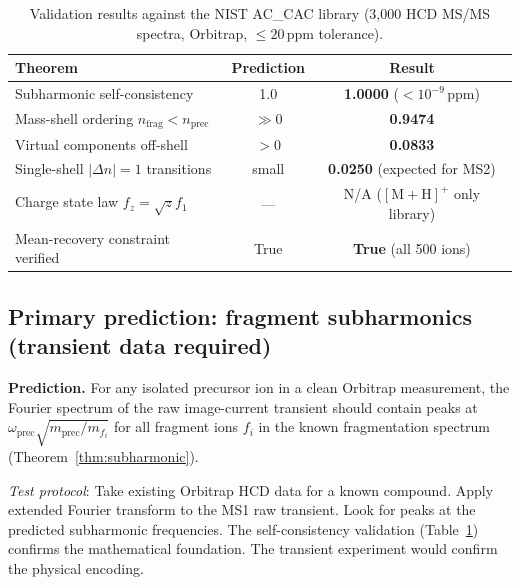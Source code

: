 \documentclass[twocolumn,10pt,a4paper]{article}
\theoremstyle{thmstyle}
\theoremstyle{definition}
\theoremstyle{remark}
\begin{document}
\begin{table}[h]
\centering
\caption{Validation results against the NIST AC\_CAC library
         (3{,}000 HCD MS/MS spectra, Orbitrap, $\leq 20$\,ppm tolerance).}
\label{tab:validation_phasecoherence}
\small
\begin{tabular}{lcc}
\toprule
\textbf{Theorem} & \textbf{Prediction} & \textbf{Result} \\
\midrule
Subharmonic self-consistency
  & 1.0
  & \textbf{1.0000} ($<10^{-9}$\,ppm) \\
Mass-shell ordering $n_{\text{frag}} < n_{\text{prec}}$
  & $\gg 0$
  & \textbf{0.9474} \\
Virtual components off-shell
  & $> 0$
  & \textbf{0.0833} \\
Single-shell $|\Delta n|=1$ transitions
  & small
  & \textbf{0.0250} (expected for MS2) \\
Charge state law $f_z = \sqrt{z}f_1$
  & ---
  & N/A ($[\mathrm{M+H}]^+$ only library) \\
Mean-recovery constraint verified
  & True
  & \textbf{True} (all 500 ions) \\
\bottomrule
\end{tabular}
\end{table}

\subsection{Primary prediction: fragment subharmonics (transient data required)}

\textbf{Prediction.} For any isolated precursor ion in a clean
Orbitrap measurement, the Fourier spectrum of the raw image-current transient
should contain peaks at
$\omega_{\text{prec}}\sqrt{m_{\text{prec}}/m_{f_i}}$ for all fragment
ions $f_i$ in the known fragmentation spectrum (Theorem~\ref{thm:subharmonic}).

\textit{Test protocol}: Take existing Orbitrap HCD data for a known
compound. Apply extended Fourier transform to the MS1 raw transient.
Look for peaks at the predicted subharmonic frequencies. The
self-consistency validation (Table~\ref{tab:validation_phasecoherence})
confirms the mathematical foundation. The transient experiment would
confirm the physical encoding.
\end{document}
